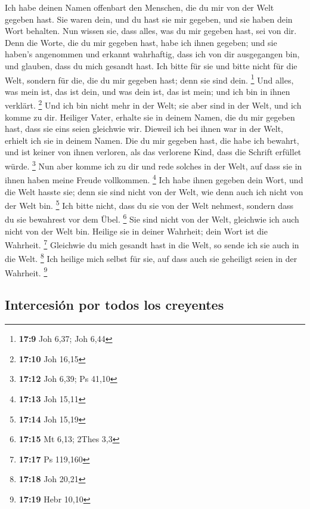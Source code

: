  Ich habe deinen Namen offenbart den Menschen, die du mir
von der Welt gegeben hast. Sie waren dein, und du hast sie mir gegeben,
und sie haben dein Wort behalten.  Nun wissen sie, dass
alles, was du mir gegeben hast, sei von dir.  Denn die
Worte, die du mir gegeben hast, habe ich ihnen gegeben; und sie haben's
angenommen und erkannt wahrhaftig, dass ich von dir ausgegangen bin, und
glauben, dass du mich gesandt hast.  Ich bitte für sie und
bitte nicht für die Welt, sondern für die, die du mir gegeben hast; denn
sie sind dein. \footnote{\textbf{17:9} Joh 6,37; Joh 6,44}
 Und alles, was mein ist, das ist dein, und was dein ist,
das ist mein; und ich bin in ihnen verklärt. \footnote{\textbf{17:10}
  Joh 16,15}  Und ich bin nicht mehr in der Welt; sie
aber sind in der Welt, und ich komme zu dir. Heiliger Vater, erhalte sie
in deinem Namen, die du mir gegeben hast, dass sie eins seien gleichwie
wir.  Dieweil ich bei ihnen war in der Welt, erhielt ich
sie in deinem Namen. Die du mir gegeben hast, die habe ich bewahrt, und
ist keiner von ihnen verloren, als das verlorene Kind, dass die Schrift
erfüllet würde. \footnote{\textbf{17:12} Joh 6,39; Ps 41,10}
 Nun aber komme ich zu dir und rede solches in der Welt,
auf dass sie in ihnen haben meine Freude vollkommen. \footnote{\textbf{17:13}
  Joh 15,11}  Ich habe ihnen gegeben dein Wort, und die
Welt hasste sie; denn sie sind nicht von der Welt, wie denn auch ich
nicht von der Welt bin. \footnote{\textbf{17:14} Joh 15,19}
 Ich bitte nicht, dass du sie von der Welt nehmest,
sondern dass du sie bewahrest vor dem Übel. \footnote{\textbf{17:15} Mt
  6,13; 2Thes 3,3}  Sie sind nicht von der Welt,
gleichwie ich auch nicht von der Welt bin.  Heilige sie
in deiner Wahrheit; dein Wort ist die Wahrheit. \footnote{\textbf{17:17}
  Ps 119,160}  Gleichwie du mich gesandt hast in die
Welt, so sende ich sie auch in die Welt. \footnote{\textbf{17:18} Joh
  20,21}  Ich heilige mich selbst für sie, auf dass auch
sie geheiligt seien in der Wahrheit. \footnote{\textbf{17:19} Hebr 10,10}

\hypertarget{intercesiuxf3n-por-todos-los-creyentes}{%
\subsection{Intercesión por todos los
creyentes}\label{intercesiuxf3n-por-todos-los-creyentes}}

